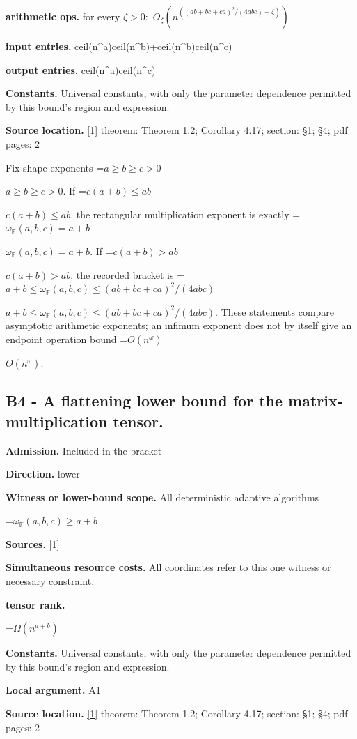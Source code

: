 \documentclass[10pt,a4paper]{article}
\newcommand{\AtlasMath}[1]{\par\begingroup\centering\setbox0=\hbox{$\displaystyle #1$}\ifdim\wd0>1.4\linewidth\typeout{ATLAS WIDE FORMULA: \the\wd0}\fi\ifdim\wd0>\linewidth\resizebox{\linewidth}{!}{\box0}\else\box0\fi\par\endgroup}
\newcommand{\AtlasInlineMath}[1]{\begingroup\setbox0=\hbox{$#1$}\ifdim\wd0>.4\linewidth\endgroup\AtlasMath{#1}\else\endgroup$#1$\fi}
\begin{document}
\textbf{arithmetic ops.} for every $\zeta >0:$ $O_\zeta (n^((ab+bc+ca)^2/(4abc)+\zeta ))$

\textbf{input entries.} ceil(n\textasciicircum{}a)ceil(n\textasciicircum{}b)+ceil(n\textasciicircum{}b)ceil(n\textasciicircum{}c)

\textbf{output entries.} ceil(n\textasciicircum{}a)ceil(n\textasciicircum{}c)

\textbf{Constants.} Universal constants, with only the parameter dependence permitted by this bound’s region and expression.

\textbf{Source location.} \href{https://arxiv.org/pdf/2610.30054v1}{[1]} theorem: Theorem 1.2; Corollary 4.17; section: §1; §4; pdf pages: 2

Fix shape exponents \AtlasInlineMath{a\ge b\ge c>0}. If \AtlasInlineMath{c(a+b)\le ab}, the rectangular multiplication exponent is exactly \AtlasInlineMath{\omega_{\mathbb F}(a,b,c)=a+b}. If \AtlasInlineMath{c(a+b)>ab}, the recorded bracket is \AtlasInlineMath{a+b\le\omega_{\mathbb F}(a,b,c)\le(ab+bc+ca)^2/(4abc)}. These statements compare asymptotic arithmetic exponents; an infimum exponent does not by itself give an endpoint operation bound \AtlasInlineMath{O(n^\omega)}.

\subsection{B4 - A flattening lower bound for the matrix-multiplication tensor.}
\textbf{Admission.} Included in the bracket

\textbf{Direction.} lower

\textbf{Witness or lower-bound scope.} All deterministic adaptive algorithms

\AtlasMath{\omega_{\mathbb{F}}(a,b,c)\ge a+b}
\textbf{Sources.} \href{https://arxiv.org/pdf/2610.30054v1}{[1]}

\textbf{Simultaneous resource costs.} All coordinates refer to this one witness or necessary constraint.

\textbf{tensor rank.}

\AtlasMath{\Omega (n^{a+b})}
\textbf{Constants.} Universal constants, with only the parameter dependence permitted by this bound’s region and expression.

\textbf{Local argument.} A1

\textbf{Source location.} \href{https://arxiv.org/pdf/2610.30054v1}{[1]} theorem: Theorem 1.2; Corollary 4.17; section: §1; §4; pdf pages: 2
\end{document}
